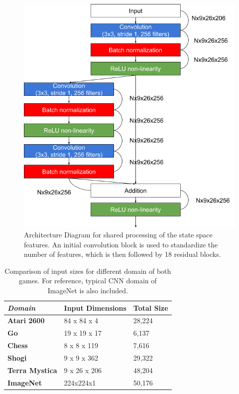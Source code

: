 \documentclass[12pt,twocolumn,letterpaper]{article}
\begin{document}
\begin{figure}[h!]
    \centering
    \includegraphics[scale=0.3]{../figures/architecture}
    \caption{Architecture Diagram for shared processing of the state space features. An initial convolution block is used to standardize the number of features, which is then followed by 18 residual blocks.}
    \label{fig:input_architecture_diagram}
\end{figure}

\begin{table}[h!]
\begin{tabular}{|l|l|l|}
\hline
\textit{\textbf{Domain}} & \textbf{Input Dimensions} & \textbf{Total Size} \\ \hline
\textbf{Atari 2600}      & 84 x 84 x 4               & 28,224              \\ \hline
\textbf{Go}              & 19 x 19 x 17              & 6,137               \\ \hline
\textbf{Chess}           & 8 x 8 x 119               & 7,616               \\ \hline
\textbf{Shogi}           & 9 x 9 x 362               & 29,322              \\ \hline
\textbf{Terra Mystica}   & 9 x 26 x 206              & 48,204              \\ \hline
\textbf{ImageNet}        & 224x224x1                 & 50,176              \\ \hline
\end{tabular}
\caption{Comparison of input sizes for different domain of both games. For reference, typical CNN domain of ImageNet is also included.}
\label{table:input_size_comparison}
\end{table}
\end{document}
